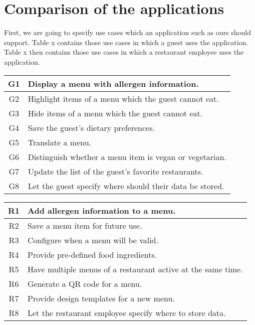 \section{Comparison of the applications}
First, we are going to specify use cases which an application such as ours should support.
Table x contains those use cases in which a guest uses the application.
Table x then contains those use cases in which a restaurant employee uses the application.

\begin{center}
  \begin{tabular}{| c | l |}
    \hline
    G1 & Display a menu with allergen information. \\
    \hline
    G2 & Highlight items of a menu which the guest cannot eat.  \\
    \hline
    G3 & Hide items of a menu which the guest cannot eat.  \\
    \hline
    G4 & Save the guest's dietary preferences.  \\
    \hline
    G5 & Translate a menu.  \\
    \hline
    G6 & Distinguish whether a menu item is vegan or vegetarian.  \\
    \hline
    G7 & Update the list of the guest's favorite restaurants.  \\
    \hline
    G8 & Let the guest specify where should their data be stored. \\ 
    \hline
  \end{tabular}
  \newline
\end{center}

\begin{center}
  \begin{tabular}{| c | l |}
    \hline
    R1 & Add allergen information to a menu. \\
    \hline
    R2 & Save a menu item for future use. \\
    \hline
    R3 & Configure when a menu will be valid. \\
    \hline
    R4 & Provide pre-defined food ingredients. \\
    \hline
    R5 & Have multiple menus of a restaurant active at the same time. \\    
    \hline
    R6 & Generate a QR code for a menu. \\
    \hline 
    R7 & Provide design templates for a new menu. \\
    \hline 
    R8 & Let the restaurant employee specify where to store data. \\
    \hline
  \end{tabular}
  \newline
\end{center}

